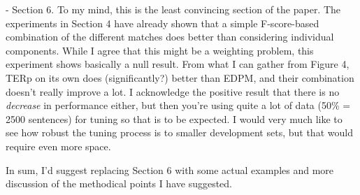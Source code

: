 \documentclass[letterpaper,12pt]{article}
\begin{document}
- Section 6. To my mind, this is the least convincing section of the
 paper. The experiments in Section 4 have already shown that a simple
 F-score-based combination of the different matches does better than
 considering individual components. While I agree that this might be
 a weighting problem, this experiment shows basically a null result.
 From what I can gather from Figure 4, TERp on its own does
 (significantly?) better than EDPM, and their combination doesn't
 really improve a lot. I acknowledge the positive result that there
 is no \emph{decrease} in performance either, but then you're using quite
 a lot of data (50\% = 2500 sentences) for tuning so that is to be
 expected. I would very much like to see how robust the tuning
 process is to smaller development sets, but that would require even
 more space.  

 In sum, I'd suggest replacing Section 6 with some actual examples
 and more discussion of the methodical points I have suggested.
\end{document}
